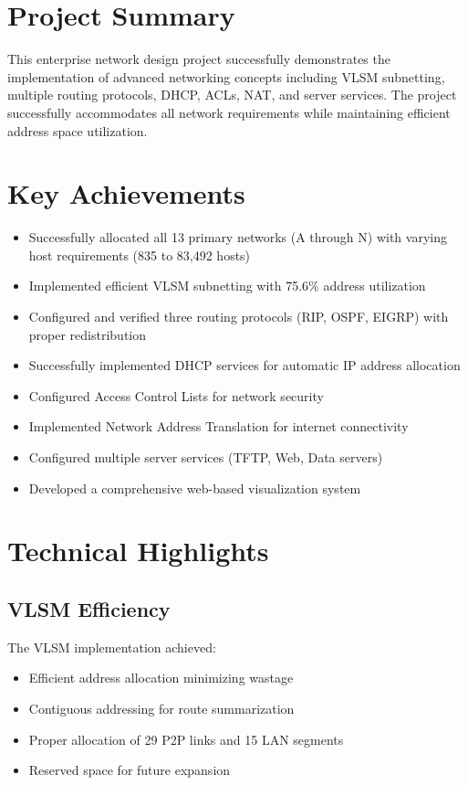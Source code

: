 \documentclass[12pt,a4paper]{report}
\begin{document}
\section{Project Summary}

This enterprise network design project successfully demonstrates the implementation of advanced networking concepts including VLSM subnetting, multiple routing protocols, DHCP, ACLs, NAT, and server services. The project successfully accommodates all network requirements while maintaining efficient address space utilization.

\section{Key Achievements}

\begin{itemize}
    \item Successfully allocated all 13 primary networks (A through N) with varying host requirements (835 to 83,492 hosts)
    \item Implemented efficient VLSM subnetting with 75.6\% address utilization
    \item Configured and verified three routing protocols (RIP, OSPF, EIGRP) with proper redistribution
    \item Successfully implemented DHCP services for automatic IP address allocation
    \item Configured Access Control Lists for network security
    \item Implemented Network Address Translation for internet connectivity
    \item Configured multiple server services (TFTP, Web, Data servers)
    \item Developed a comprehensive web-based visualization system
\end{itemize}

\section{Technical Highlights}

\subsection{VLSM Efficiency}

The VLSM implementation achieved:
\begin{itemize}
    \item Efficient address allocation minimizing wastage
    \item Contiguous addressing for route summarization
    \item Proper allocation of 29 P2P links and 15 LAN segments
    \item Reserved space for future expansion
\end{itemize}
\end{document}

